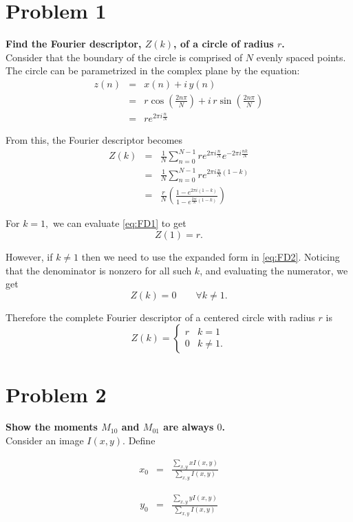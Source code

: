 \documentclass[aps,letterpaper,10pt]{article}
\begin{document}
\section{Problem 1}
\textbf{Find the Fourier descriptor, $Z(k)$, of a circle of radius $r$.}\\

\noindent Consider that the boundary of the circle is comprised of $N$ evenly spaced points.  The circle can be parametrized in the complex plane by the equation:
\begin{eqnarray}
z(n) & = & x(n) + i\, y(n) \nonumber \\
& = & r \cos\left(\frac{2n\pi}{N}\right) + i\, r \sin\left(\frac{2n\pi}{N}\right) \nonumber \\
 & = & r e^{2\pi i\frac{n}{N}}
\end{eqnarray}

\noindent From this, the Fourier descriptor becomes
\begin{eqnarray}
Z(k) & = & \frac{1}{N} \sum_{n=0}^{N-1} r e^{2\pi i\frac{n}{N}} e^{-2\pi i\frac{n k}{N}} \nonumber \\
& = & \frac{1}{N} \sum_{n=0}^{N-1} r e^{2\pi i\frac{n}{N} (1-k)} \label{eq:FD1}\\
& = & \frac{r}{N}\left(\frac{1-e^{2\pi i(1-k)}}{1-e^{\frac{2\pi i}{N}(1-k)}}\right) \label{eq:FD2}
\end{eqnarray}

\noindent For $k=1,$ we can evaluate \eqref{eq:FD1} to get $$Z(1) = r.$$

\noindent However, if $k\neq 1$ then we need to use the expanded form in \eqref{eq:FD2}.  Noticing that the denominator is nonzero for all such $k$, and evaluating the numerator, we get $$Z(k) = 0\qquad\forall k\neq 1.$$

\noindent Therefore the complete Fourier descriptor of a centered circle with radius $r$ is
$$Z(k) =
\begin{cases}
r & k=1 \\
0& k\neq1.
\end{cases}
$$

\newpage
\section{Problem 2}
\textbf{Show the moments $M_{10}$ and $M_{01}$ are always $0$.}\\

\noindent Consider an image $I(x,y)$. Define \\
\begin{minipage}[c]{.49\textwidth}
\begin{eqnarray*}
x_0 & = & \frac{\sum_{x,y} x I(x,y)}{\sum_{x,y} I(x,y)}
\end{eqnarray*}
\end{minipage}
\begin{minipage}[c]{.49\textwidth}
\begin{eqnarray*}
y_0 & = & \frac{\sum_{x,y} y I(x,y)}{\sum_{x,y} I(x,y)}
\end{eqnarray*}
\end{minipage}
\vspace{20px}
\end{document}
